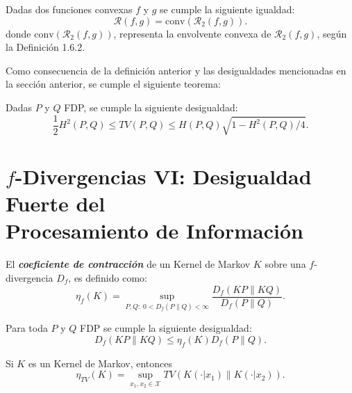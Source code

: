 \begin{theorem}\cite{harremoes2011pairs}
    Dadas dos funciones convexas $f$ y $g$ se cumple la siguiente igualdad:
    \begin{equation*}
        \mathcal{R}(f,g)=\text{conv}(\mathcal{R}_2(f,g)).
    \end{equation*}
donde $\text{conv}(\mathcal{R}_2(f,g))$, representa la envolvente convexa de $\mathcal{R}_2(f,g)$, seg\'un la Definici\'on 1.6.2.    
\end{theorem}

Como consecuencia de la definici\'on anterior y las desigualdades mencionadas en la secci\'on anterior, se cumple el siguiente teorema:

\begin{theorem}\cite{harremoes2011pairs}
    Dadas $P$ y $Q$ FDP, se cumple la siguiente desigualdad:
    \begin{equation}\label{eq:H2TVHsqrtH}
        \frac{1}{2}H^2(P,Q)\leq TV(P,Q)\leq H(P,Q)\sqrt{1-H^2(P,Q)/4}.
    \end{equation}
\end{theorem}

\section{$f$-Divergencias VI: Desigualdad Fuerte del\\ Procesamiento de Informaci\'on}

\begin{definition}\cite{ahlswede1976spreading,dobrushin1956central}
    El \textit{\textbf{coeficiente de contracci\'on}} de un Kernel de Markov $K$ sobre una $f$-divergencia $D_f$, es definido como:
    \begin{equation}\label{eq:ContractionCoeff}
        \eta_f(K)=\sup_{P,Q:\;0<D_f(P\|Q)<\infty}\frac{D_f(KP\|KQ)}{D_f(P\|Q)}.
    \end{equation}
\end{definition}

\begin{theorem}\cite{ahlswede1976spreading,dobrushin1956central}
    Para toda $P$ y $Q$ FDP se cumple la siguiente desigualdad:
    \begin{equation}\label{eq:StrongDPI}
        D_f(KP\|KQ)\leq\eta_f(K)D_f(P\|Q).
    \end{equation}
\end{theorem}

\begin{theorem}\cite{ahlswede1976spreading,dobrushin1956central}
    Si $K$ es un Kernel de Markov, entonces
    \begin{equation}\label{eq:TVContractionCoeff}
        \eta_{TV}(K)=\sup_{x_1,x_2\in\mathcal{X}}TV(K(\cdot|x_1)\|K(\cdot|x_2)).
    \end{equation}
\end{theorem}


